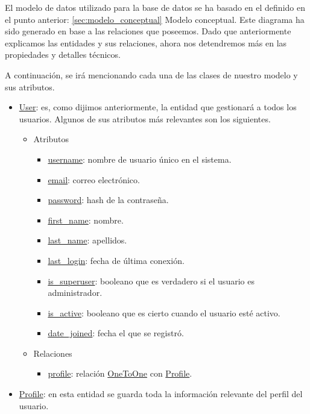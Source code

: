 El modelo de datos utilizado para la base de datos se ha basado en el definido en el punto anterior: \ref{sec:modelo_conceptual} Modelo conceptual. Este diagrama ha sido generado en base a las relaciones que poseemos. Dado que anteriormente explicamos las entidades y sus relaciones, ahora nos detendremos más en las propiedades y detalles técnicos.


A continuación, se irá mencionando cada una de las clases de nuestro modelo y sus atributos.

\begin{itemize}
    \item \underline{User}: es, como dijimos anteriormente, la entidad que gestionará a todos los usuarios. Algunos de sus atributos más relevantes son los siguientes.
    \begin{itemize}
        \item Atributos
        \begin{itemize}
            \item \underline{username}: nombre de usuario único en el sistema.
            \item \underline{email}: correo electrónico.
            \item \underline{password}: hash de la contraseña.
            \item \underline{first\_name}: nombre.
            \item \underline{last\_name}: apellidos.
            \item \underline{last\_login}: fecha de última conexión.
            \item \underline{is\_superuser}: booleano que es verdadero si el usuario es administrador.
            \item \underline{is\_active}: booleano que es cierto cuando el usuario esté activo.
            \item \underline{date\_joined}: fecha el que se registró.
        \end{itemize}
        \item Relaciones
        \begin{itemize}
            \item \underline{profile}: relación \underline{OneToOne} con \underline{Profile}.
        \end{itemize}
    \end{itemize}
    \item \underline{Profile}: en esta entidad se guarda toda la información relevante del perfil del usuario.

\end{itemize}
